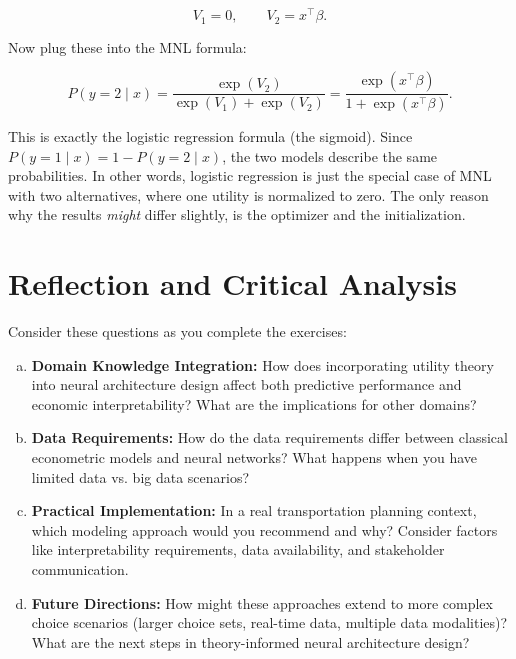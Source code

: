 \documentclass[11pt]{article}
\begin{document}
\begin{equation}
V_1 = 0, \qquad V_2 = x^\top \beta.
\end{equation}  

\noindent Now plug these into the MNL formula:

\begin{equation}
P(y=2 \mid x) = \frac{\exp(V_2)}{\exp(V_1) + \exp(V_2)} 
= \frac{\exp(x^\top \beta)}{1 + \exp(x^\top \beta)}.
\end{equation}

\noindent This is exactly the logistic regression formula (the sigmoid). Since $P(y=1 \mid x) = 1 - P(y=2 \mid x)$, the two models describe the same probabilities. In other words, logistic regression is just the special case of MNL with two alternatives, where one utility is normalized to zero. The only reason why the results \textit{might} differ slightly, is the optimizer and the initialization.

\section*{Reflection and Critical Analysis}

Consider these questions as you complete the exercises:

\begin{enumerate}[(a)]
\item \textbf{Domain Knowledge Integration:} How does incorporating utility theory into neural architecture design affect both predictive performance and economic interpretability? What are the implications for other domains?

\item \textbf{Data Requirements:} How do the data requirements differ between classical econometric models and neural networks? What happens when you have limited data vs. big data scenarios?

\item \textbf{Practical Implementation:} In a real transportation planning context, which modeling approach would you recommend and why? Consider factors like interpretability requirements, data availability, and stakeholder communication.

\item \textbf{Future Directions:} How might these approaches extend to more complex choice scenarios (larger choice sets, real-time data, multiple data modalities)? What are the next steps in theory-informed neural architecture design?
\end{enumerate}
\end{document}
